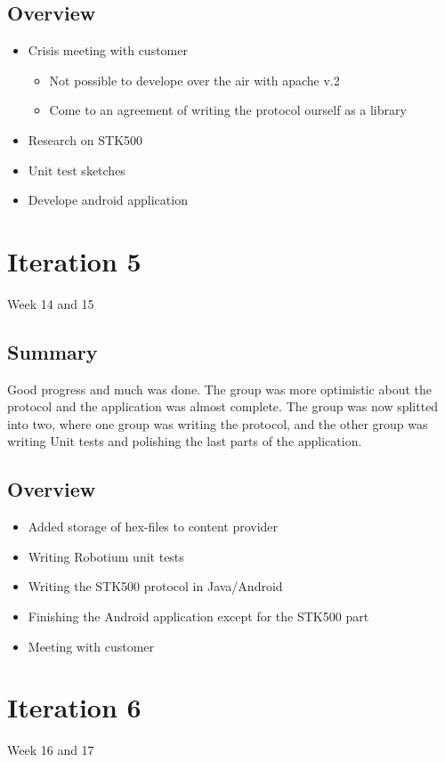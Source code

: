 \subsection{Overview}
\begin{itemize}
	\item{Crisis meeting with customer}
	\begin{itemize}
		\item{Not possible to develope over the air with apache v.2}
		\item{Come to an agreement of writing the protocol ourself as a library}
	\end{itemize}
	\item{Research on STK500}
	\item{Unit test sketches}
	\item{Develope android application}
\end{itemize}

\section{Iteration 5}
Week 14 and 15
\subsection{Summary}
	Good progress and much was done. The group was more optimistic about the protocol and the application was almost complete.
	The group was now splitted into two, where one group was writing the protocol, and the other group was writing Unit tests and polishing the last parts of the application.

\subsection{Overview}
\begin{itemize}
	\item{Added storage of hex-files to content provider}
	\item{Writing Robotium unit tests}
	\item{Writing the STK500 protocol in Java/Android}
	\item{Finishing the Android application except for the STK500 part}
	\item{Meeting with customer}
\end{itemize}

\section{Iteration 6}
Week 16 and 17
